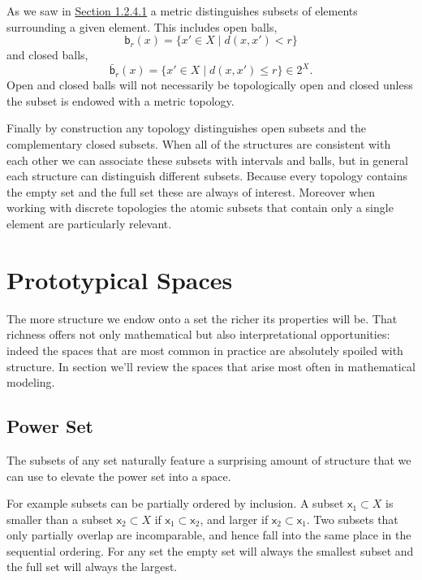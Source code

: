 \documentclass[
  letterpaper,
  DIV=11,
  numbers=noendperiod]{scrartcl}
\begin{document}
As we saw in \href{@sec:open-balls}{Section 1.2.4.1} a metric
distinguishes subsets of elements surrounding a given element. This
includes open balls, \[
\mathsf{b}_{r}(x) = \{ x' \in X \mid d(x, x') < r \}
\] and closed balls, \[
\bar{\mathsf{b}}_{r}(x) = \{ x' \in X \mid d(x, x') \le r \} \in 2^{X}.
\] Open and closed balls will not necessarily be topologically open and
closed unless the subset is endowed with a metric topology.

Finally by construction any topology distinguishes open subsets and the
complementary closed subsets. When all of the structures are consistent
with each other we can associate these subsets with intervals and balls,
but in general each structure can distinguish different subsets. Because
every topology contains the empty set and the full set these are always
of interest. Moreover when working with discrete topologies the atomic
subsets that contain only a single element are particularly relevant.

\hypertarget{sec:proto-spaces}{%
\section{Prototypical Spaces}\label{sec:proto-spaces}}

The more structure we endow onto a set the richer its properties will
be. That richness offers not only mathematical but also interpretational
opportunities: indeed the spaces that are most common in practice are
absolutely spoiled with structure. In section we'll review the spaces
that arise most often in mathematical modeling.

\hypertarget{power-set}{%
\subsection{Power Set}\label{power-set}}

The subsets of any set naturally feature a surprising amount of
structure that we can use to elevate the power set into a space.

For example subsets can be partially ordered by inclusion. A subset
\(\mathsf{x}_{1} \subset X\) is smaller than a subset
\(\mathsf{x}_{2} \subset X\) if
\(\mathsf{x}_{1} \subset \mathsf{x}_{2}\), and larger if
\(\mathsf{x}_{2} \subset \mathsf{x}_{1}\). Two subsets that only
partially overlap are incomparable, and hence fall into the same place
in the sequential ordering. For any set the empty set will always the
smallest subset and the full set will always the largest.
\end{document}
